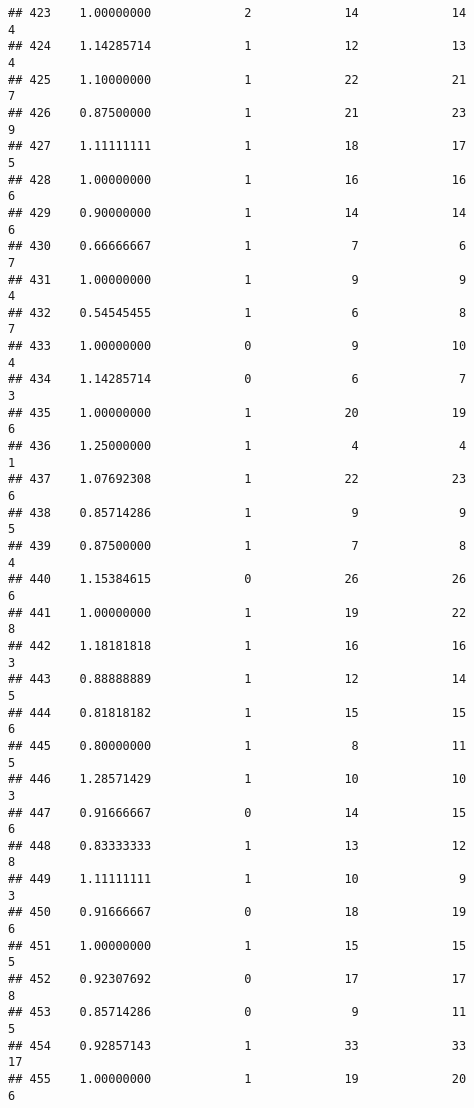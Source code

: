 \documentclass[
]{article}
\begin{document}
\begin{verbatim}
## 423    1.00000000             2             14             14              4
## 424    1.14285714             1             12             13              4
## 425    1.10000000             1             22             21              7
## 426    0.87500000             1             21             23              9
## 427    1.11111111             1             18             17              5
## 428    1.00000000             1             16             16              6
## 429    0.90000000             1             14             14              6
## 430    0.66666667             1              7              6              7
## 431    1.00000000             1              9              9              4
## 432    0.54545455             1              6              8              7
## 433    1.00000000             0              9             10              4
## 434    1.14285714             0              6              7              3
## 435    1.00000000             1             20             19              6
## 436    1.25000000             1              4              4              1
## 437    1.07692308             1             22             23              6
## 438    0.85714286             1              9              9              5
## 439    0.87500000             1              7              8              4
## 440    1.15384615             0             26             26              6
## 441    1.00000000             1             19             22              8
## 442    1.18181818             1             16             16              3
## 443    0.88888889             1             12             14              5
## 444    0.81818182             1             15             15              6
## 445    0.80000000             1              8             11              5
## 446    1.28571429             1             10             10              3
## 447    0.91666667             0             14             15              6
## 448    0.83333333             1             13             12              8
## 449    1.11111111             1             10              9              3
## 450    0.91666667             0             18             19              6
## 451    1.00000000             1             15             15              5
## 452    0.92307692             0             17             17              8
## 453    0.85714286             0              9             11              5
## 454    0.92857143             1             33             33             17
## 455    1.00000000             1             19             20              6

\end{verbatim}
\end{document}
